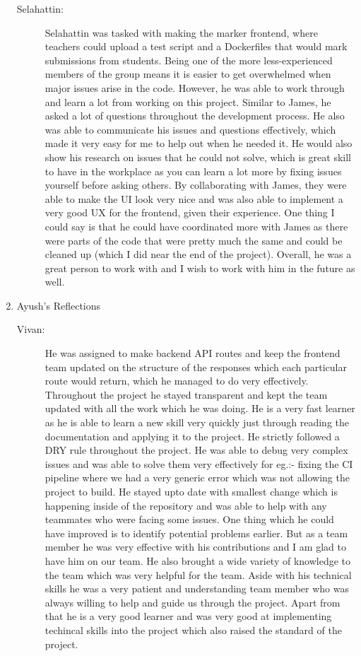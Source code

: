 \documentclass[a4paper, 12pt]{article}
\begin{document}
\begin{enumerate}
\begin{description}
            \item[Selahattin: ] Selahattin was tasked with making the marker frontend, where teachers could upload a test script and a Dockerfiles that would mark submissions from students. Being one of the more less-experienced members of the group means it is easier to get overwhelmed when major issues arise in the code. However, he was able to work through and learn a lot from working on this project. Similar to James, he asked a lot of questions throughout the development process. He also was able to communicate his issues and questions effectively, which made it very easy for me to help out when he needed it. He would also show his research on issues that he could not solve, which is great skill to have in the workplace as you can learn a lot more by fixing issues yourself before asking others. By collaborating with James, they were able to make the UI look very nice and was also able to implement a very good UX for the frontend, given their experience. One thing I could say is that he could have coordinated more with James as there were parts of the code that were pretty much the same and could be cleaned up (which I did near the end of the project). Overall, he was a great person to work with and I wish to work with him in the future as well.
        \end{description}
    \item Ayush's Reflections
        \begin{description}
            \item[Vivan: ] He was assigned to make backend API routes and keep the frontend team updated on the structure of the responses which each particular route would return, which he managed to do very effectively. Throughout the project he stayed transparent and kept the team updated with all the work which he was doing. He is a very fast learner as he is able to learn a new skill very quickly just through reading the documentation and applying it to the project. He strictly followed a DRY rule throughout the project. He was able to debug very complex issues and was able to solve them very effectively for eg.:- fixing the CI pipeline where we had a very generic error which was not allowing the project to build. He stayed upto date with smallest change which is happening inside of the repository and was able to help with any teammates who were facing some issues. One thing which he could have improved is to identify potential problems earlier. But as a team member he was very effective with his contributions and I am glad to have him on our team. He also brought a wide variety of knowledge to the team which was very helpful for the team. Aside with his technical skills he was a very patient and understanding team member who was always willing to help and guide us through the project. Apart from that he is a very good learner and was very good at implementing techincal skills into the project which also raised the standard of the project.

\end{description}
\end{enumerate}
\end{document}
